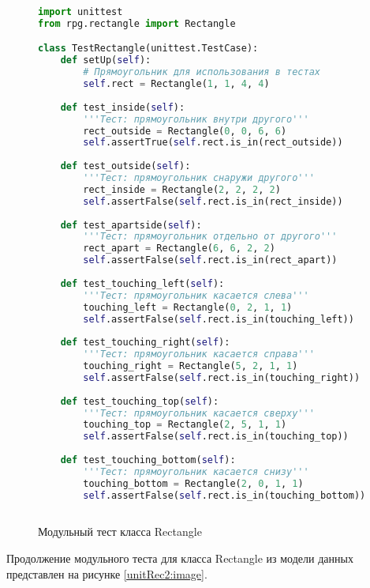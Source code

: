 \begin{figure}[H]
\begin{lstlisting}[language=Python]
import unittest
from rpg.rectangle import Rectangle

class TestRectangle(unittest.TestCase):
	def setUp(self):
		# Прямоугольник для использования в тестах
		self.rect = Rectangle(1, 1, 4, 4)
	
	def test_inside(self):
		'''Тест: прямоугольник внутри другого'''
		rect_outside = Rectangle(0, 0, 6, 6)
		self.assertTrue(self.rect.is_in(rect_outside))
	
	def test_outside(self):
		'''Тест: прямоугольник снаружи другого'''
		rect_inside = Rectangle(2, 2, 2, 2)
		self.assertFalse(self.rect.is_in(rect_inside))
	
	def test_apartside(self):
		'''Тест: прямоугольник отдельно от другого'''
		rect_apart = Rectangle(6, 6, 2, 2)
		self.assertFalse(self.rect.is_in(rect_apart))
	
	def test_touching_left(self):
		'''Тест: прямоугольник касается слева'''
		touching_left = Rectangle(0, 2, 1, 1)
		self.assertFalse(self.rect.is_in(touching_left))
		
	def test_touching_right(self):
		'''Тест: прямоугольник касается справа'''
		touching_right = Rectangle(5, 2, 1, 1)
		self.assertFalse(self.rect.is_in(touching_right))
	
	def test_touching_top(self):
		'''Тест: прямоугольник касается сверху'''
		touching_top = Rectangle(2, 5, 1, 1)
		self.assertFalse(self.rect.is_in(touching_top))
	
	def test_touching_bottom(self):
		'''Тест: прямоугольник касается снизу'''
		touching_bottom = Rectangle(2, 0, 1, 1)
		self.assertFalse(self.rect.is_in(touching_bottom))
	

\end{lstlisting}  
\caption{Модульный тест класса Rectangle}
\label{unitRec:image}
\end{figure}
Продолжение модульного теста для класса Rectangle из модели данных представлен на рисунке \ref{unitRec2:image}.
